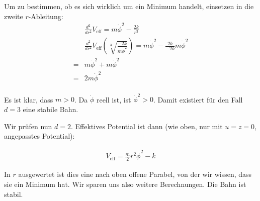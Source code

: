 \documentclass[a4paper,german,12pt,smallheadings]{scrartcl}
\begin{document}
Um zu bestimmen, ob es sich wirklich um ein Minimum handelt, einsetzen in die zweite $r$-Ableitung:
\begin{align*}
  &\frac{d^2}{dr^2} V_{\text{eff}} = m\dot{\phi}^2 - \frac{2k}{r^3}\\
  &\frac{d^2}{dr^2} V_{\text{eff}}(\sqrt[3]{\frac{-2k}{m\dot{\phi}^2}}) =  m\dot{\phi}^2 - \frac{2k}{-2k} m\dot{\phi}^2 \\
  = &m\dot{\phi}^2 + m\dot{\phi}^2 \\
  = &2m\dot{\phi}^2\\
\end{align*}

Es ist klar, dass $m > 0$. Da $\dot{\phi}$ reell ist, ist $\dot{\phi}^2 > 0$. Damit existiert für den Fall $d=3$ eine stabile Bahn.

Wir prüfen nun $d=2$. Effektives Potential ist dann (wie oben, nur mit $u=z=0$, angepasstes Potential):

\begin{align*}
  V_{\text{eff}} = \frac{m}{2}r^2\dot{\phi}^2 - k
\end{align*}

In $r$ ausgewertet ist dies eine nach oben offene Parabel, von der wir wissen,
dass sie ein Minimum hat. Wir sparen uns also weitere Berechnungen. Die Bahn
ist stabil.
\end{document}
